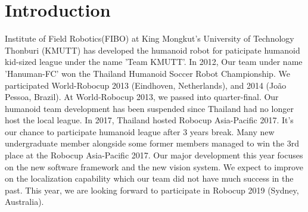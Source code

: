 \section{Introduction}

Institute of Field Robotics(FIBO) at King Mongkut's University of Technology Thonburi (KMUTT) has developed the humanoid robot for paticipate humanoid kid-sized league under the name 'Team KMUTT'. In 2012, Our team under name 'Hanuman-FC' won the Thailand Humanoid Soccer Robot Championship. We participated World-Robocup 2013 (Eindhoven, Netherlands), and 2014 (João Pessoa, Brazil). At World-Robocup 2013, we passed into quarter-final. Our humanoid team development has been suspended since Thailand had no longer host the local league. In 2017, Thailand hosted Robocup Asia-Pacific 2017. It's our chance to participate humanoid league after 3 years break. Many new undergraduate member alongside some former members managed to win the 3rd place at the Robocup Asia-Pacific 2017. Our major development this year focuses on the new software framework and the new vision system. We expect to improve on the localization capability which our team did not have much success in the past. This year, we are looking forward to participate in Robocup 2019 (Sydney, Australia).